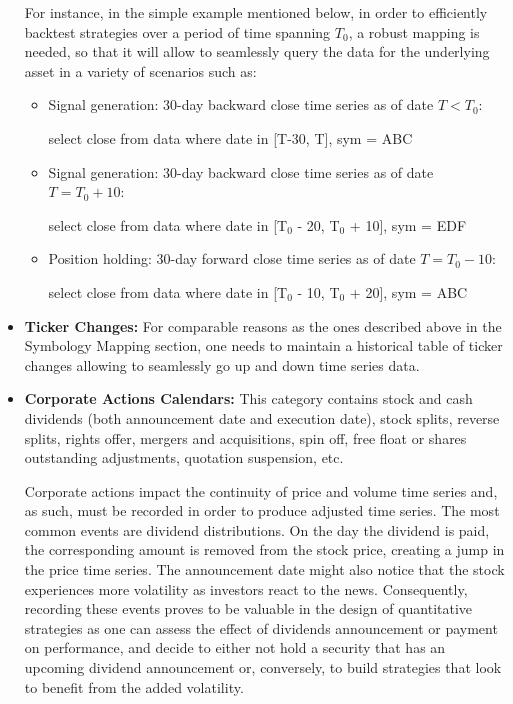 \begin{itemize}
For instance, in the simple example mentioned below, in order to efficiently backtest strategies over a period of time spanning $T_0$, a robust mapping is needed, so that it will allow to seamlessly query the data for the underlying asset in a variety of scenarios such as:

\begin{itemize}
\item Signal generation: 30-day backward close time series as of date $T < T_0$: \par
{\ttfamily select close from data where date in [T-30,  T], sym = ABC}

\item Signal generation: 30-day backward close time series as of date $T= T_0+10$: \par
{\ttfamily select close from data where date in [T$_0$ - 20, T$_0$ + 10], sym = EDF}

\item Position holding: 30-day forward close time series as of date $T= T_0-10$: \par
{\ttfamily select close from data where date in [T$_0$ - 10,  T$_0$ + 20], sym = ABC}
\end{itemize}


\item \textbf{Ticker Changes:} For comparable reasons as the ones described above in the Symbology Mapping section, one needs to maintain a historical table of ticker changes allowing to seamlessly go up and down time series data. 


\item \textbf{Corporate Actions Calendars:} This category contains stock and cash dividends (both announcement date and execution date), stock splits, reverse splits, rights offer, mergers and acquisitions, spin off, free float or shares outstanding adjustments, quotation suspension, etc.


Corporate actions impact the continuity of price and volume time series and, as such, must be recorded in order to produce adjusted time series. The most common events are dividend distributions. On the day the dividend is paid, the corresponding amount is removed from the stock price, creating a jump in the price time series. The announcement date might also notice that the stock experiences more volatility as investors react to the news. Consequently, recording these events proves to be valuable in the design of quantitative strategies as one can assess the effect of dividends announcement or payment on performance, and decide to either not hold a security that has an upcoming dividend announcement or, conversely, to build strategies that look to benefit from the added volatility. 



\end{itemize}
